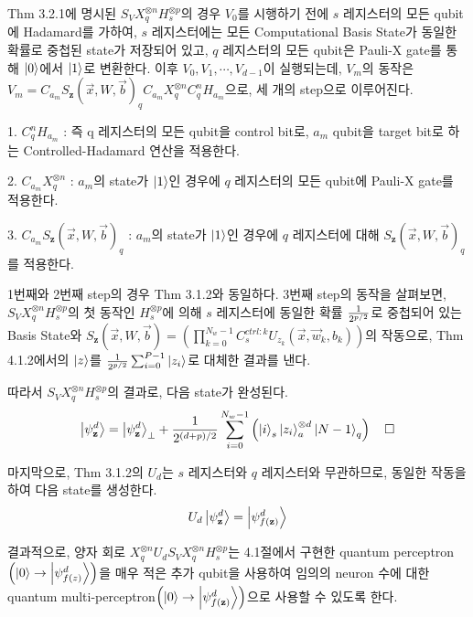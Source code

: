 \begin{pf}

Thm 3.2.1에 명시된 \(S_V X_q^{\otimes n} H_s^{\otimes p}\)의 경우 $V_0$를 시행하기 전에 \(s\) 레지스터의 모든 qubit에 Hadamard를 가하여, \(s\) 레지스터에는 모든 Computational Basis State가 동일한 확률로 중첩된 state가 저장되어 있고, \(q\) 레지스터의 모든 qubit은 Pauli-X gate를 통해 \(\ket 0\)에서 \(\ket 1\)로 변환한다. 이후 \(V_0, V_1, \cdots, V_{d-1}\)이 실행되는데, $V_m$의 동작은 \(V_m = C_{a_m}S_{\mathbf{z}}(\vec{x}, W, \vec{b})_q C_{a_m}X^{\otimes n}_q C_q^nH_{a_m}\)으로, 세 개의 step으로 이루어진다.

1. \(C_q^nH_{a_m}\) : 즉 q 레지스터의 모든 qubit을 control bit로, \(a_m\) qubit을 target bit로 하는 Controlled-Hadamard 연산을 적용한다.

2. \(C_{a_m}X^{\otimes n}_q\) : \(a_m\)의 state가 \(\ket 1\)인 경우에 \(q\) 레지스터의 모든 qubit에 Pauli-X gate를 적용한다.

3. \(C_{a_m}S_{\mathbf{z}}(\vec{x}, W, \vec{b})_q\) : \(a_m\)의 state가 \(\ket 1\)인 경우에 \(q\) 레지스터에 대해 \(S_{\mathbf{z}}(\vec{x}, W, \vec{b})_q\)를 적용한다.

1번째와 2번째 step의 경우 Thm 3.1.2와 동일하다. 3번째 step의 동작을 살펴보면, \(S_V X_q^{\otimes n} H_s^{\otimes p}\)의 첫 동작인 \(H_s^{\otimes p}\)에 의해 \(s\) 레지스터에 동일한 확률 \(1 \over {2^{p/2}}\)로 중첩되어 있는 Basis State와 \(S_{\mathbf z}(\vec{x}, W, \vec{b})= \left(\prod_{k=0}^{N_w-1}C_{s}^{ctrl : k}U_{z_k}(\vec{x}, \vec{w}_k, b_k)\right)\)의 작동으로, Thm 4.1.2에서의 \(\ket{z}\)를 \({1\over {2^{p/2}}}\sum_{i=0}^{P-1} \ket{z_i}\)로 대체한 결과를 낸다.

따라서 \(S_V X_q^{\otimes n} H_s^{\otimes p}\)의 결과로, 다음 state가 완성된다.
\[
    \ket{\psi_{\mathbf z}^d} = \ket{\psi_{\mathbf z}^d}_{\perp} + {1 \over {2^{(d + p) / 2}}}\sum_{i=0}^{N_w - 1}\left( \ket{i}_{s} \ket{z_i}_{a}^{\otimes d} \ket{N-1}_q \right) \quad \square
\]
\end{pf}

마지막으로, Thm 3.1.2의 $U_d$는 \(s\) 레지스터와 \(q\) 레지스터와 무관하므로, 동일한 작동을 하여 다음 state를 생성한다.
\[
    U_d \ket{\psi_{\mathbf z}^d} = \ket{\psi_{f(\mathbf z)}^d}
\]

결과적으로, 양자 회로 \(X_q^{\otimes n} U_d S_V X_q^{\otimes n} H_s^{\otimes p}\)는 4.1절에서 구현한 quantum perceptron\(\left(\ket{0} \rightarrow \ket{\psi_{ f(z)}^d}\right)\)을 매우 적은 추가 qubit을 사용하여 임의의 neuron 수에 대한 quantum multi-perceptron\(\left(\ket{0} \rightarrow \ket{\psi_{f(\mathbf z)}^d}\right)\)으로 사용할 수 있도록 한다.
